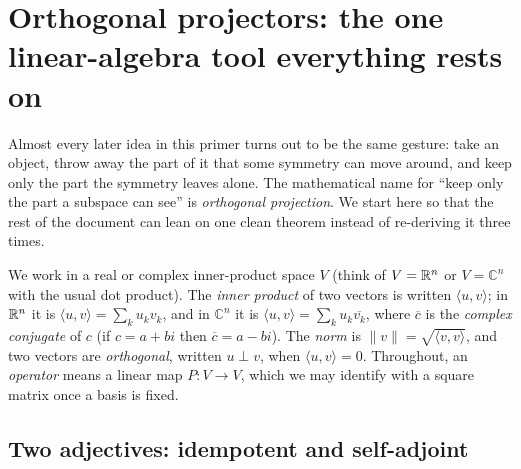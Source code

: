 %
%

\section{Orthogonal projectors: the one linear-algebra tool everything rests on}
\label{sec:projectors}

Almost every later idea in this primer turns out to be the same gesture: take an
object, throw away the part of it that some symmetry can move around, and keep only
the part the symmetry leaves alone. The mathematical name for ``keep only the part a
subspace can see'' is \emph{orthogonal projection}. We start here so that the rest of
the document can lean on one clean theorem instead of re-deriving it three times.

We work in a real or complex inner-product space $V$ (think of $V = \mathbb{R}^n$ or $V =
\mathbb{C}^n$ with the usual dot product). The \emph{inner product} of two vectors is
written $\langle u, v\rangle$; in $\mathbb{R}^n$ it is $\langle u,v\rangle = \sum_k u_k v_k$,
and in $\mathbb{C}^n$ it is $\langle u,v\rangle = \sum_k u_k \overline{v_k}$, where
$\overline{c}$ is the \emph{complex conjugate} of $c$ (if $c = a + bi$ then
$\overline{c} = a - bi$). The \emph{norm} is $\|v\| = \sqrt{\langle v,v\rangle}$, and
two vectors are \emph{orthogonal}, written $u \perp v$, when $\langle u,v\rangle = 0$.
Throughout, an \emph{operator} means a linear map $P : V \to V$, which we may identify
with a square matrix once a basis is fixed.

\subsection{Two adjectives: idempotent and self-adjoint}

